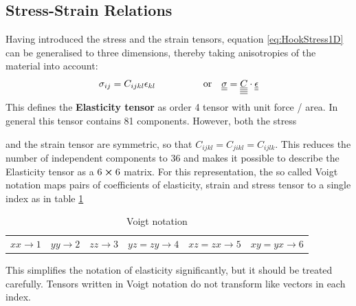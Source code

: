 \subsection{Stress-Strain Relations}
Having introduced the stress and the strain tensors, equation
\ref{eq:HookStress1D} can be generalised to three dimensions, thereby taking
anisotropies of the material into account:
\begin{align} \label{eq:HookStress3D}
     & \sigma_{ij} =  C_{ijkl}\epsilon_{kl} \quad\quad\quad
    \quad \quad \text{or}
     & \underline{\underline{\sigma}} = \underline{\underline{\underline{\underline{C}}}} \cdot \underline{\underline{\epsilon}}
\end{align}
This defines the \textbf{Elasticity tensor} as order 4 tensor with unit force
/ area. In general this tensor contains 81 components. However, both the stress

and
the strain tensor are symmetric, so that $C_{ijkl} = C_{jikl} = C_{ijlk}$. This
reduces the number of independent components to 36 and makes it possible to
describe the Elasticity tensor as a $6\cross6$ matrix. For this representation,
the so called Voigt notation maps pairs of coefficients of elasticity, strain
and stress tensor to a single index as in table \ref{tab:voigt}
\begin{table}[t]
    \centering
    \begin{tabular}{cccccc}
        $xx \rightarrow 1$ & $yy \rightarrow 2$    & $zz \rightarrow 3$    &
        $yz=zy
        \rightarrow 4$     & $xz=zx \rightarrow 5$ & $xy=yx \rightarrow 6$
    \end{tabular}
    \caption{Voigt notation}
    \label{tab:voigt}
\end{table}
This simplifies the notation of elasticity significantly, but it should be
treated carefully. Tensors written in Voigt notation do not transform like
vectors in each index.

